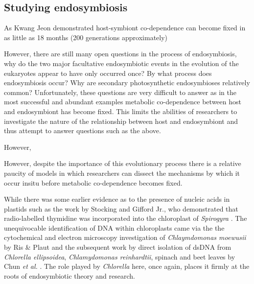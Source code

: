\subsection{Studying endosymbiosis}



As Kwang Jeon demonstrated host-symbiont co-dependence \citep{Jeon1972} can become fixed in as little as 18 months (200 generations approximately)  \citep{Jeon1978}

However, there are still many open questions in the process of endosymbiosis,
why do the two major facultative endosymbiotic events in the evolution of the eukaryotes
appear to have only occurred once? By what process does endosymbiosis occur?
Why are secondary photosynthetic endosymbioses relatively common?
Unfortunately, these questions are very difficult to answer as in the most successful
and abundant examples metabolic co-dependence between host and endosymbiont has become
fixed.  This limits the abilities of researchers to investigate the nature of the
relationship between host and endosymbiont and thus attempt to answer questions
such as the above. 

However,  






However, despite the importance of this evolutionary process there is a relative
paucity of models in which researchers can dissect the mechanisms by which it occur
in\-situ before metabolic co-dependence becomes fixed.














While there was some earlier evidence as to the presence of nucleic acids in 
plastids such as the work by Stocking and Gifford Jr., who demonstrated that
radio-labelled thymidine was incorporated into the chloroplast of \textit{Spirogyra}
\citep{Stocking1959}.
The unequivocable identification of DNA within chloroplasts came via the 
the cytochemical and electron microscopy investigation of \textit{Chlaymdomonas moewusii} 
by Ris \& Plaut \citep{Ris1962} and the subsequent work by direct isolation of
dsDNA from \textit{Chlorella ellipsoidea}, \textit{Chlamydomonas reinhardtii}, spinach
and beet leaves by Chun \textit{et al.} \citep{Chun1963}. The role played by
\textit{Chlorella} here, once again, places it firmly at the roots of endosymbiotic
theory and research.







